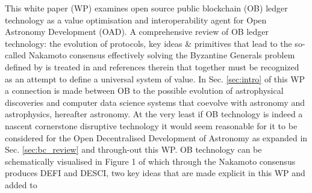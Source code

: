 \documentclass[final,5p,times,twocolumn,authoryear]{elsarticle}
\begin{document}
This white paper (WP) examines open source public blockchain (OB) ledger technology as a value optimisation and interoperability agent for Open Astronomy Development (OAD). A comprehensive review of OB ledger technology: the evolution of protocols, key ideas \& primitives that lead to the so-called Nakamoto consensus effectively solving the Byzantine Generals problem defined by \cite{Lamport1982TheBG} is treated in  \cite{arvindandclark2017} and references therein that together must be recognized as an attempt to define a universal system of value. In Sec. \ref{sec:intro} of this WP a connection is made between OB to the possible evolution of astrophysical discoveries and computer data science systems that coevolve with astronomy and astrophysics, hereafter astronomy. At the very least if OB technology is indeed a nascent cornerstone disruptive technology it would seem reasonable for it to be considered for the Open Decentralised Development of Astronomy as expanded in Sec. \ref{sec:bc_review} and through-out this WP.  OB technology can be schematically visualised in Figure 1 of \cite{arvindandclark2017} which through the Nakamoto consensus produces DEFI and DESCI, two key ideas that are made explicit in this WP and added to
\end{document}
